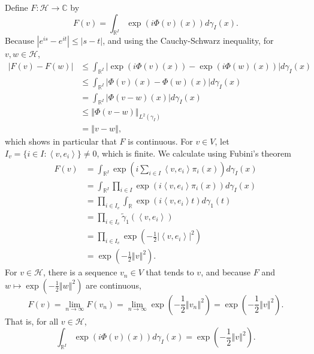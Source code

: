 \documentclass{article}
\newcommand{\inner}[2]{\left\langle #1, #2 \right\rangle}
\newcommand{\norm}[1]{\left\Vert #1 \right\Vert}
\theoremstyle{definition}
\begin{document}
Define $F:\mathscr{H} \to \mathbb{C}$ by
\[
F(v) = \int_{\mathbb{R}^I} \exp(i\Phi(v)(x)) d\gamma_I(x).
\]
Because $|e^{is}-e^{it}| \leq |s-t|$, and using the Cauchy-Schwarz
inequality, for $v,w \in \mathscr{H}$,
\begin{align*}
|F(v)-F(w)|&\leq \int_{\mathbb{R}^I} \left|  \exp(i\Phi(v)(x))  - \exp(i\Phi(w)(x)) \right| d\gamma_I(x)\\
&\leq \int_{\mathbb{R}^I} |\Phi(v)(x)-\Phi(w)(x)| d\gamma_I(x)\\
&=\int_{\mathbb{R}^I} |\Phi(v-w)(x)| d\gamma_I(x)\\
&\leq \norm{\Phi(v-w)}_{L^2(\gamma_I)}\\
&=\norm{v-w},
\end{align*}
which shows in particular that $F$ is continuous.
For $v \in V$, let $I_v=\{i \in I: \inner{v}{e_i}\} \neq 0$, which is finite.
We calculate using Fubini's theorem
\begin{align*}
F(v)&=
\int_{\mathbb{R}^I} \exp\left(i\sum_{i \in I} \inner{v}{e_i} \pi_i(x) \right) d\gamma_I(x)\\
&=\int_{\mathbb{R}^I} \prod_{i \in I} \exp(i\inner{v}{e_i} \pi_i(x)) d\gamma_I(x)\\
&=\prod_{i \in I_v} \int_{\mathbb{R}}   \exp(i\inner{v}{e_i} t) d\gamma_1(t)\\
&=\prod_{i \in I_v} \widetilde{\gamma}_1(\inner{v}{e_i})\\
&=\prod_{i \in I_v} \exp\left(-\frac{1}{2} |\inner{v}{e_i}|^2\right)\\
&=\exp\left(-\frac{1}{2} \norm{v}^2\right).
\end{align*}
For $v \in \mathscr{H}$, there is a sequence $v_n \in V$ that tends to $v$, and because $F$ and 
$w \mapsto \exp\left(-\frac{1}{2} \norm{w}^2\right)$ are
 continuous, 
\[
F(v) = \lim_{n \to \infty} F(v_n) = \lim_{n \to \infty} \exp\left(-\frac{1}{2} \norm{v_n}^2\right)
=\exp\left(-\frac{1}{2} \norm{v}^2 \right).
\]
That is, for all $v \in \mathscr{H}$,
\[
 \int_{\mathbb{R}^I} \exp(i\Phi(v)(x)) d\gamma_I(x) = \exp\left(-\frac{1}{2} \norm{v}^2 \right).
\]
\end{document}
